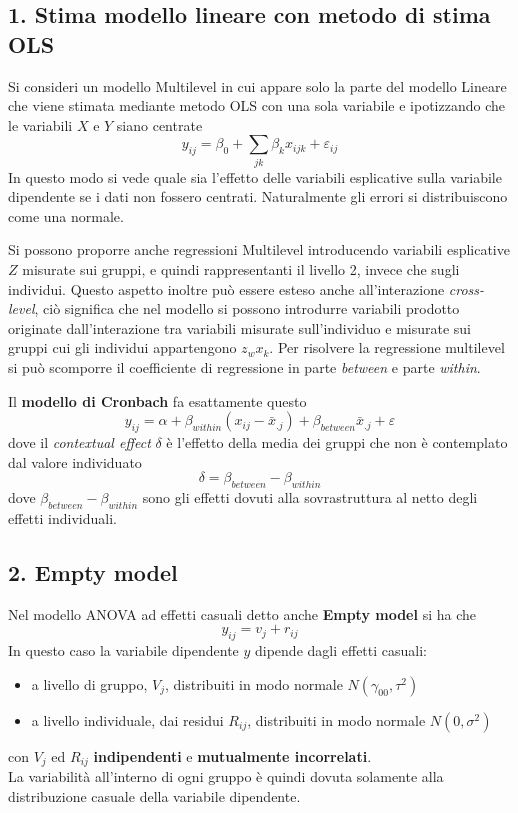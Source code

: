 \documentclass[a4page, 11pt]{article} %
\begin{document}
\subsection*{1. Stima modello lineare con metodo di stima OLS}
Si consideri un modello Multilevel in cui appare solo la parte del modello Lineare che viene stimata mediante metodo OLS con una sola variabile e ipotizzando che le variabili $X$ e $Y$ siano centrate
\begin{equation*}
y_{ij}= \beta_0+\sum_{jk} \beta_k x_{ijk}+\varepsilon_{ij}
\end{equation*}
In questo modo si vede quale sia l’effetto delle variabili esplicative sulla variabile dipendente se i dati non fossero centrati. Naturalmente gli errori si distribuiscono come una normale.

Si possono proporre anche regressioni Multilevel introducendo variabili esplicative $Z$ misurate sui gruppi, e quindi rappresentanti il livello 2, invece che sugli individui. Questo aspetto inoltre può essere esteso anche all'interazione \textit{cross-level}, ciò significa che nel modello si possono introdurre variabili prodotto originate dall'interazione tra variabili misurate sull'individuo e misurate sui gruppi cui gli individui appartengono $z_w x_k$. Per risolvere la regressione multilevel si può scomporre il coefficiente di regressione in parte \textit{between} e parte \textit{within}. 

Il \textbf{modello di Cronbach} fa esattamente questo
\begin{equation*}
y_{ij} = \alpha +\beta_{within}(x_{ij}-\bar{x}_{.j}) +\beta_{between}\bar{x}_{.j}+\varepsilon
\end{equation*}
dove il \textit{contextual effect} $\delta$ è l'effetto della media dei gruppi che non è contemplato dal valore individuato
\begin{equation*}
\delta = \beta_{between}-\beta_{within}
\end{equation*}
dove $\beta_{between}-\beta_{within}$ sono gli effetti dovuti alla sovrastruttura al netto degli effetti individuali. 
\subsection*{2. Empty model}
Nel modello ANOVA ad effetti casuali detto anche \textbf{Empty model} si ha che
\begin{equation*}
y_{ij}=v_j+r_{ij}
\end{equation*}
In questo caso la variabile dipendente $y$ dipende dagli effetti casuali:
\begin{itemize}
\item a livello di gruppo, $V_j$, distribuiti in modo normale $N(\gamma_{00}, \tau^2)$
\item a livello individuale, dai residui $R_{ij}$, distribuiti in modo normale $N(0, \sigma^2)$ 
\end{itemize}
con $V_j$ ed $R_{ij}$ \textbf{indipendenti} e \textbf{mutualmente incorrelati}. \\
La variabilità all’interno di ogni gruppo è quindi dovuta solamente alla distribuzione casuale della variabile dipendente.
\end{document}
